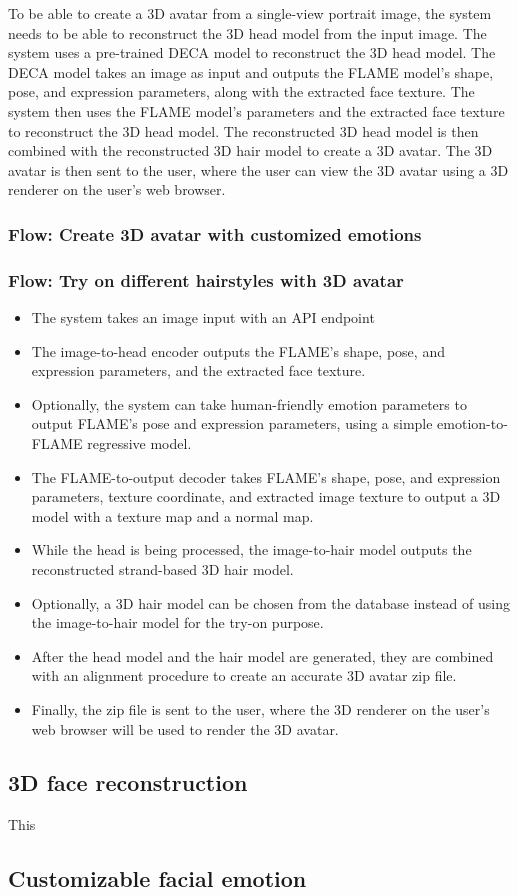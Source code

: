 To be able to create a 3D avatar from a single-view portrait image, the system needs to be able to reconstruct the 3D head model from the input image. The system uses a pre-trained DECA model \cite{fengLearningAnimatableDetailed2021} to reconstruct the 3D head model. The DECA model takes an image as input and outputs the FLAME \cite{liLearningLightweightMesh2020} model's shape, pose, and expression parameters, along with the extracted face texture. The system then uses the FLAME model's parameters and the extracted face texture to reconstruct the 3D head model. The reconstructed 3D head model is then combined with the reconstructed 3D hair model to create a 3D avatar. The 3D avatar is then sent to the user, where the user can view the 3D avatar using a 3D renderer on the user's web browser.


\subsubsection{Flow: Create 3D avatar with customized emotions}

\subsubsection{Flow: Try on different hairstyles with 3D avatar}




\begin{itemize}
    \item The system takes an image input with an API endpoint
    \item The image-to-head encoder outputs the FLAME's shape, pose, and expression parameters, and the extracted face texture.
    \item Optionally, the system can take human-friendly emotion parameters to output FLAME's pose and expression parameters, using a simple emotion-to-FLAME regressive model.
    \item The FLAME-to-output decoder takes FLAME's shape, pose, and expression parameters, texture coordinate, and extracted image texture to output a 3D model with a texture map and a normal map.
    \item While the head is being processed, the image-to-hair model outputs the reconstructed strand-based 3D hair model.
    \item Optionally, a 3D hair model can be chosen from the database instead of using the image-to-hair model for the try-on purpose.
    \item After the head model and the hair model are generated, they are combined with an alignment procedure to create an accurate 3D avatar zip file.
    \item Finally, the zip file is sent to the user, where the 3D renderer on the user's web browser will be used to render the 3D avatar.
\end{itemize}


\subsection{3D face reconstruction}
This

\subsection{Customizable facial emotion}

